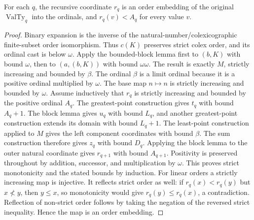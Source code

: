 \begin{theorem}
\label{hir:disjoint-invariant-ordinal-embedding}
\leanok
For each $q$, the recursive coordinate $r_q$ is an order embedding of the
original $\operatorname{ValTy}_q$ into the ordinals, and $r_q(v)<A_q$
for every value $v$.
\end{theorem}
\begin{proof}
Binary expansion is the inverse of the natural-number/colexicographic
finite-subset order isomorphism. Thus $c(K)$ preserves strict colex order,
and its ordinal cast is below $\omega$. Apply the bounded-block lemma
first to $(b,K)$ with bound $\omega$, then to $(a,(b,K))$ with bound
$\omega\omega$. The result is exactly $M$, strictly increasing and
bounded by $\beta$. The ordinal $\beta$ is a limit ordinal because it is
a positive ordinal multiplied by $\omega$.
The base map $n\mapsto n$ is strictly increasing and bounded by $\omega$.
Assume inductively that $r_q$ is strictly increasing and bounded by the
positive ordinal $A_q$. The greatest-point construction gives $t_q$ with
bound $A_q+1$. The block lemma gives $u_q$ with bound $L_q$, and another
greatest-point construction extends its domain with bound $L_q+1$.
The least-point construction applied to $M$ gives the left component
coordinates with bound $\beta$. The sum construction therefore gives
$z_q$ with bound $D_q$. Applying the block lemma to the outer natural
coordinate gives $r_{q+1}$ with bound $A_{q+1}$. Positivity is preserved
throughout by addition, successor, and multiplication by $\omega$.
This proves strict monotonicity and the stated bounds by induction.
For linear orders a strictly increasing map is injective. It reflects
strict order as well: if $r_q(x)<r_q(y)$ but $x\not<y$, then $y\le x$,
so monotonicity would give $r_q(y)\le r_q(x)$, a contradiction. Reflection
of non-strict order follows by taking the negation of the reversed strict
inequality. Hence the map is an order embedding.
\end{proof}

